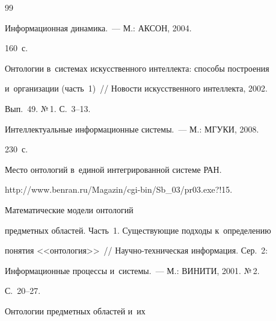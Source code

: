 {\small\frenchspacing


{%




\begin{thebibliography}{99}




   Информационная динамика.~--- М.: АКСОН, 2004. 


160~с. 









Онтологии в~сис\-те\-мах искусственного интеллекта: способы построения 


и~организации (часть~1)~/\!\!/ Новости искусственного интеллекта, 2002. 


Вып.~49. №\,1. С.~3--13. 




   Интеллектуальные информационные системы.~--- М.: МГУКИ, 2008.


  230~с.


  




   Место онтологий в~единой интегрированной системе РАН. 


{\sf http://www.benran.ru/Magazin/cgi-bin/Sb\_03/pr03.exe?!15}.




   Математические модели онтологий 


предметных областей. Часть~1. Существующие подходы к~определению 


понятия <<онтология>>~/\!\!/ Научно-техническая информация. Сер.~2: 


Информационные процессы и~системы.~--- М.: ВИНИТИ, 2001. №\,2.  


С.~20--27. 


  




   Онтологии предметных областей и~их 



\end{thebibliography}}}
